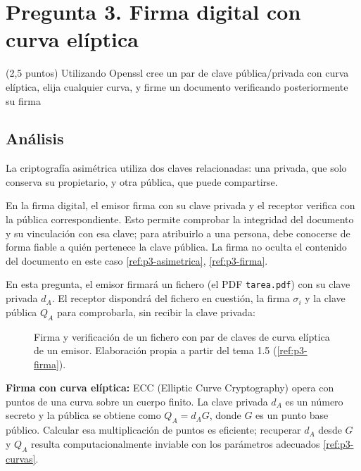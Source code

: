 \section{Pregunta 3. Firma digital con curva elíptica}
\label{sec:pregunta3}

\begin{enunciado}{(2,5 puntos)}
Utilizando Openssl cree un par de clave pública/privada con curva elíptica, elija cualquier curva, y firme un documento verificando posteriormente su firma
\end{enunciado}

\subsection{Análisis}

La criptografía asimétrica utiliza dos claves relacionadas: una privada, que solo conserva su propietario, y otra pública, que puede compartirse.

En la firma digital, el emisor firma con su clave privada y el receptor verifica con la pública correspondiente. Esto permite comprobar la integridad del documento y su vinculación con esa clave; para atribuirlo a una persona, debe conocerse de forma fiable a quién pertenece la clave pública.
La firma no oculta el contenido del documento en este caso \ref{ref:p3-asimetrica}, \ref{ref:p3-firma}.

En esta pregunta, el emisor firmará un fichero (el PDF \texttt{tarea.pdf}) con su clave privada $d_A$. El receptor dispondrá del fichero en cuestión, la firma $\sigma_i$ y la clave pública $Q_A$ para comprobarla, sin recibir la clave privada:

\begin{figure}[H]
  \centering
  \resizebox{\textwidth}{!}{}
  \caption{Firma y verificación de un fichero con par de claves de curva elíptica de un emisor. Elaboración propia a partir del tema 1.5 (\ref{ref:p3-firma}).}
  \label{fig:p3-claves-asimetricas}
\end{figure}

\clearpage
\textbf{Firma con curva elíptica:} ECC (Elliptic Curve Cryptography) opera con puntos de una curva sobre un cuerpo finito. La clave privada $d_A$ es un número secreto y la pública se obtiene como $Q_A=d_AG$, donde $G$ es un punto base público. Calcular esa multiplicación de puntos es eficiente; recuperar $d_A$ desde $G$ y $Q_A$ resulta computacionalmente inviable con los parámetros adecuados \ref{ref:p3-curvas}.

